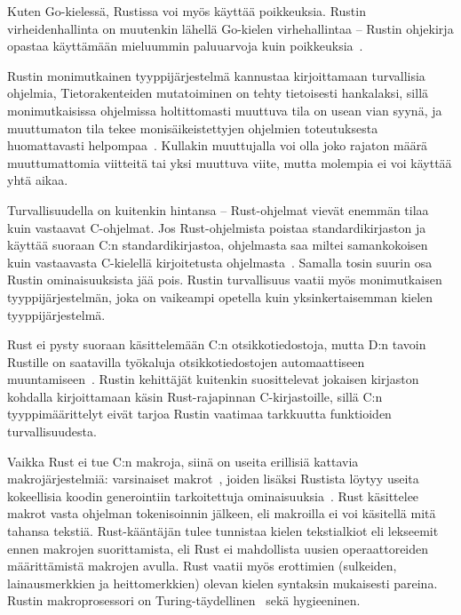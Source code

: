 Kuten Go-kielessä, Rustissa voi myös käyttää poikkeuksia. Rustin
virheidenhallinta on muutenkin lähellä Go-kielen virhehallintaa -- Rustin
ohjekirja opastaa käyttämään mieluummin paluuarvoja kuin
poikkeuksia~\citep{rusterrorhandling}.

Rustin monimutkainen tyyppijärjestelmä kannustaa kirjoittamaan turvallisia
ohjelmia, Tietorakenteiden mutatoiminen on tehty tietoisesti hankalaksi, sillä
monimutkaisissa ohjelmissa holtittomasti muuttuva tila on usean vian syynä, ja
muuttumaton tila tekee monisäikeistettyjen ohjelmien
toteutuksesta huomattavasti helpompaa~\citep[luku 4, kohta 17]{effectivejava}.
Kullakin muuttujalla voi olla joko rajaton määrä muuttumattomia
viitteitä tai yksi muuttuva viite, mutta molempia ei voi käyttää yhtä aikaa.

Turvallisuudella on kuitenkin hintansa -- Rust-ohjelmat vievät enemmän tilaa
kuin vastaavat C-ohjelmat. Jos Rust-ohjelmista poistaa standardikirjaston ja
käyttää suoraan C:n standardikirjastoa, ohjelmasta saa miltei samankokoisen
kuin vastaavasta C-kielellä kirjoitetusta ohjelmasta~\citep{rustbinarysize}.
Samalla tosin suurin osa Rustin ominaisuuksista jää pois. Rustin turvallisuus
vaatii myös monimutkaisen tyyppijärjestelmän, joka on vaikeampi opetella kuin
yksinkertaisemman kielen tyyppijärjestelmä.

Rust ei pysty suoraan käsittelemään C:n otsikkotiedostoja, mutta D:n tavoin
Rustille on saatavilla työkaluja otsikkotiedostojen automaattiseen
muuntamiseen~\citep{rustbindgen}. Rustin kehittäjät kuitenkin suosittelevat
jokaisen kirjaston kohdalla kirjoittamaan käsin Rust-rajapinnan C-kirjastoille,
sillä C:n tyyppimäärittelyt eivät tarjoa Rustin vaatimaa tarkkuutta funktioiden
turvallisuudesta.

Vaikka Rust ei tue C:n makroja, siinä on useita erillisiä kattavia
makrojärjestelmiä: varsinaiset makrot~\citep{rustmacros}, joiden lisäksi
Rustista löytyy useita kokeellisia koodin generointiin tarkoitettuja
ominaisuuksia~\citep{rustprocmacros, rustplugins}. Rust käsittelee makrot
vasta ohjelman tokenisoinnin jälkeen, eli makroilla ei voi käsitellä mitä
tahansa tekstiä. Rust-kääntäjän tulee tunnistaa kielen tekstialkiot eli
lekseemit ennen makrojen suorittamista, eli Rust ei mahdollista
uusien operaattoreiden määrittämistä makrojen avulla. Rust vaatii myös
erottimien (sulkeiden, lainausmerkkien ja heittomerkkien) olevan kielen
syntaksin mukaisesti pareina. Rustin makroprosessori on
Turing-täydellinen~\citep{rustmacros} sekä hygieeninen.

